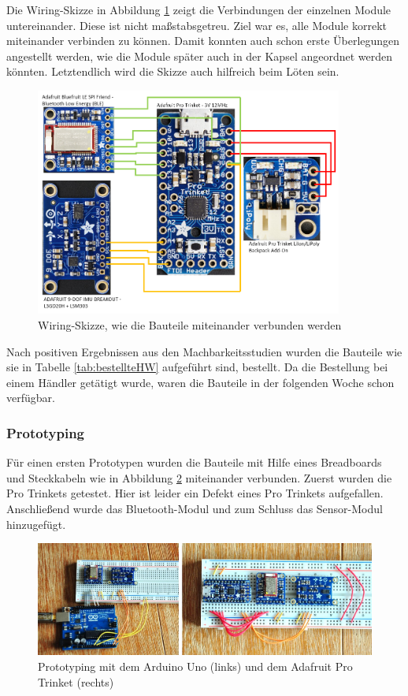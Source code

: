 Die Wiring-Skizze in Abbildung \ref{fig:k3_wiringskizze} zeigt die Verbindungen der einzelnen Module untereinander. Diese ist nicht maßstabsgetreu. Ziel war es, alle Module korrekt miteinander verbinden zu können. Damit konnten auch schon erste Überlegungen angestellt werden, wie die Module später auch in der Kapsel angeordnet werden könnten. Letztendlich wird die Skizze auch hilfreich beim Löten sein.

\begin{figure}[h]
	\centering
	\includegraphics[width=0.9\textwidth]{images/k3-wiringskizze.PNG}
	\caption {Wiring-Skizze, wie die Bauteile miteinander verbunden werden}
	\label{fig:k3_wiringskizze}
\end{figure}

Nach positiven Ergebnissen aus den Machbarkeitsstudien wurden die Bauteile wie sie in Tabelle \ref{tab:bestellteHW} aufgeführt sind, bestellt. Da die Bestellung bei einem Händler getätigt wurde, waren die Bauteile in der folgenden Woche schon verfügbar.
\newpage

\subsubsection{Prototyping}

Für einen ersten Prototypen wurden die Bauteile mit Hilfe eines Breadboards und Steckkabeln wie in Abbildung \ref{fig:k3_prototyping} miteinander verbunden. Zuerst wurden die Pro Trinkets getestet. Hier ist leider ein Defekt eines Pro Trinkets aufgefallen. Anschließend wurde das Bluetooth-Modul und zum Schluss das Sensor-Modul hinzugefügt.

\begin{figure}[h]
	\centering
	\includegraphics[width=1\textwidth]{images/k3-prototyping.JPG}
	\caption {Prototyping mit dem Arduino Uno (links) und dem Adafruit Pro Trinket (rechts)}
	\label{fig:k3_prototyping}
\end{figure}


